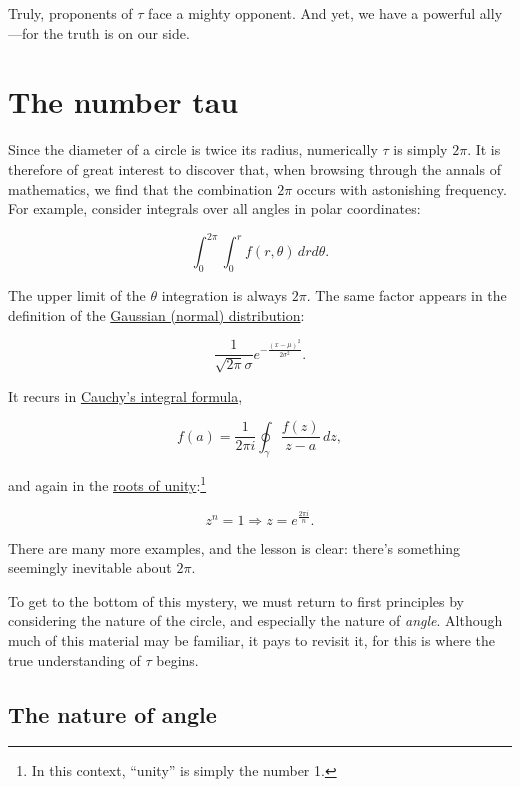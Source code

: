\documentclass{article}
\begin{document}
Truly, proponents of $\tau$ face a mighty opponent. And yet, we have a powerful ally---for the truth is on our side.


\section{The number tau} %
\label{sec:the_number_tau}

Since the diameter of a circle is twice its radius, numerically $\tau$ is simply $2\pi$. It is therefore of great interest to discover that, when browsing through the annals of mathematics, we find that the combination $2\pi$ occurs with astonishing frequency. For example, consider integrals over all angles in polar coordinates:

\[
  \int_0^{2\pi}\int_0^r f(r, \theta)\, dr d\theta.
\]

\noindent The upper limit of the $\theta$ integration is always $2\pi$. The same factor appears in the definition of the \href{http://en.wikipedia.org/wiki/Normal_distribution}{Gaussian (normal) distribution}:

\[
  \frac{1}{\sqrt{2\pi}\sigma}e^{-\frac{(x-\mu)^2}{2\sigma^2}}.
\]

\noindent It recurs in \href{http://en.wikipedia.org/wiki/Cauchy's_integral_formula}{Cauchy's integral formula},

\[
  f(a) = \frac{1}{2\pi i}\oint_\gamma\frac{f(z)}{z-a}\,dz,
\]

\noindent and again in the \href{http://en.wikipedia.org/wiki/Root_of_unity}{roots of unity}:\footnote{In this context, ``unity'' is simply the number 1.}

\[
  z^n = 1 \Rightarrow z = e^\frac{2\pi i}{n}.
\]

\noindent There are many more examples, and the lesson is clear: there's something seemingly inevitable about $2\pi$.

To get to the bottom of this mystery, we must return to first principles by considering the nature of the circle, and especially the nature of \emph{angle}. Although much of this material may be familiar, it pays to revisit it, for this is where the true understanding of $\tau$ begins.

  \subsection{The nature of angle} %
  \label{sec:the_nature_of_angle}
\end{document}
